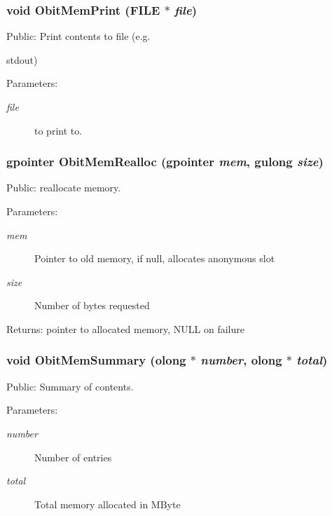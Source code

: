\subsubsection{\setlength{\rightskip}{0pt plus 5cm}void Obit\-Mem\-Print (FILE $\ast$ {\em file})}\label{ObitMem_8h_a8}


Public: Print contents to file (e.g. 

stdout) \begin{Desc}
\item[Parameters:]
\begin{description}
\item[{\em file}]to print to. \end{description}
\end{Desc}
\subsubsection{\setlength{\rightskip}{0pt plus 5cm}gpointer Obit\-Mem\-Realloc (gpointer {\em mem}, gulong {\em size})}\label{ObitMem_8h_a5}


Public: reallocate memory. 

\begin{Desc}
\item[Parameters:]
\begin{description}
\item[{\em mem}]Pointer to old memory, if null, allocates anonymous slot \item[{\em size}]Number of bytes requested \end{description}
\end{Desc}
\begin{Desc}
\item[Returns:]pointer to allocated memory, NULL on failure \end{Desc}
\subsubsection{\setlength{\rightskip}{0pt plus 5cm}void Obit\-Mem\-Summary ({\bf olong} $\ast$ {\em number}, {\bf olong} $\ast$ {\em total})}\label{ObitMem_8h_a9}


Public: Summary of contents. 

\begin{Desc}
\item[Parameters:]
\begin{description}
\item[{\em number}]Number of entries \item[{\em total}]Total memory allocated in MByte \end{description}
\end{Desc}
